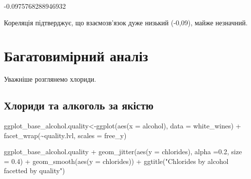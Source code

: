 \documentclass[
  letterpaper,
  DIV=11,
  numbers=noendperiod]{scrreprt}
\newenvironment{Shaded}{\begin{snugshade}}{\end{snugshade}}
\newcommand{\AttributeTok}[1]{\textcolor[rgb]{0.40,0.45,0.13}{#1}}
\newcommand{\FloatTok}[1]{\textcolor[rgb]{0.68,0.00,0.00}{#1}}
\newcommand{\FunctionTok}[1]{\textcolor[rgb]{0.28,0.35,0.67}{#1}}
\newcommand{\NormalTok}[1]{\textcolor[rgb]{0.00,0.23,0.31}{#1}}
\newcommand{\OtherTok}[1]{\textcolor[rgb]{0.00,0.23,0.31}{#1}}
\newcommand{\SpecialCharTok}[1]{\textcolor[rgb]{0.37,0.37,0.37}{#1}}
\newcommand{\StringTok}[1]{\textcolor[rgb]{0.13,0.47,0.30}{#1}}
\begin{document}
\begin{Shaded}
\end{Shaded}

-0.0975768288946932

Кореляція підтверджує, що взаємозв'язок дуже низький (-0,09), майже
незначний.

\section{Багатовимірний
аналіз}\label{ux431ux430ux433ux430ux442ux43eux432ux438ux43cux456ux440ux43dux438ux439-ux430ux43dux430ux43bux456ux437}

Уважніше розглянемо хлориди.

\subsection{Хлориди та алкоголь за
якістю}\label{ux445ux43bux43eux440ux438ux434ux438-ux442ux430-ux430ux43bux43aux43eux433ux43eux43bux44c-ux437ux430-ux44fux43aux456ux441ux442ux44e}

\begin{Shaded}
\begin{Highlighting}[]
\NormalTok{ggplot\_base\_alcohol.quality}\OtherTok{\textless{}{-}}\FunctionTok{ggplot}\NormalTok{(}\FunctionTok{aes}\NormalTok{(}\AttributeTok{x =}\NormalTok{ alcohol), }\AttributeTok{data =}\NormalTok{ white\_wines) }\SpecialCharTok{+}
  \FunctionTok{facet\_wrap}\NormalTok{(}\SpecialCharTok{\textasciitilde{}}\NormalTok{quality.lvl, }\AttributeTok{scales =} \StringTok{\textquotesingle{}free\_y\textquotesingle{}}\NormalTok{)}
  
\NormalTok{ggplot\_base\_alcohol.quality }\SpecialCharTok{+}
   \FunctionTok{geom\_jitter}\NormalTok{(}\FunctionTok{aes}\NormalTok{(}\AttributeTok{y =}\NormalTok{ chlorides), }\AttributeTok{alpha =}\FloatTok{0.2}\NormalTok{, }\AttributeTok{size =} \FloatTok{0.4}\NormalTok{) }\SpecialCharTok{+}
  \FunctionTok{geom\_smooth}\NormalTok{(}\FunctionTok{aes}\NormalTok{(}\AttributeTok{y =}\NormalTok{ chlorides)) }\SpecialCharTok{+}
  \FunctionTok{ggtitle}\NormalTok{(}\StringTok{"Chlorides by alcohol facetted by quality"}\NormalTok{)}
\end{Highlighting}
\end{Shaded}
\end{document}
